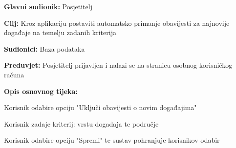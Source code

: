 					\noindent {}
\begin{packed_item}
	\item \textbf{Glavni sudionik:} Posjetitelj
	\item  \textbf{Cilj:} Kroz aplikaciju postaviti automatsko primanje obavijesti za najnovije događaje na temelju zadanih kriterija
	\item  \textbf{Sudionici:} Baza podataka
	\item  \textbf{Preduvjet:} Posjetitelj prijavljen i nalazi se na stranicu osobnog korisničkog računa
	\item  \textbf{Opis osnovnog tijeka:}
	
	\item[] \begin{packed_enum}
		
		\item Korisnik odabire opciju "Uključi obavijesti o novim događajima"
		\item Korisnik zadaje kriterij: vrstu događaja te područje
		\item Korisnik odabire opciju "Spremi" te sustav pohranjuje korisnikov odabir
	\end{packed_enum}

\end{packed_item}



